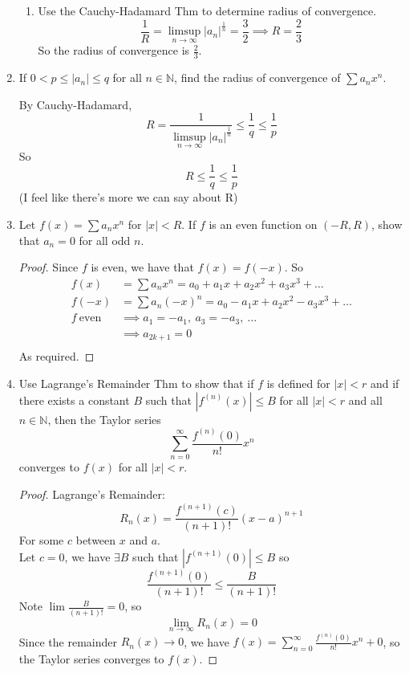 \documentclass[hidelinks,12pt]{article}
\renewcommand{\leq}{\leqslant}
\newcommand{\N}{\mathbb{N}}
\begin{document}
\begin{enumerate}
\begin{enumerate}
            \item Use the Cauchy-Hadamard Thm to determine radius of convergence.
                \[\frac{1}{R}=\limsup_{n\to\infty}|a_n|^{\frac{1}{n}}=\frac{3}{2}\implies R=\frac{2}{3}\] So the radius of convergence is $\frac{2}{3}$.
        \end{enumerate}
    \item If $0<p\leq|a_n|\leq q$ for all $n\in\N$, find the radius of convergence of $\sum a_nx^n$.
        \par\null\par By Cauchy-Hadamard, \[R=\frac{1}{\limsup_{n\to\infty}|a_n|^{\frac{1}{n}}}\leq\frac{1}{q}\leq\frac{1}{p}\] So \[R\leq\frac{1}{q}\leq\frac{1}{p}\] (I feel like there's more we can say about R)
    \item Let $f(x)=\sum a_nx^n$ for $|x|<R$. If $f$ is an even function on $(-R,R)$, show that $a_n=0$ for all odd $n$.
        \begin{proof}[Proof]
            Since $f$ is even, we have that $f(x)=f(-x)$. So 
            \begin{align*}
                f(x)&=\sum a_nx^n=a_0+a_1x+a_2x^2+a_3x^3+\dots\\
                f(-x)&=\sum a_n(-x)^n=a_0-a_1x+a_2x^2-a_3x^3+\dots\\
                f\ \mathrm{even}&\implies a_1=-a_1,\ a_3=-a_3,\ \dots\\
                                &\implies a_{2k+1}=0\\
            \end{align*} 
            As required.
        \end{proof}
    \item Use Lagrange's Remainder Thm to show that if $f$ is defined for $|x|<r$ and if there exists a constant $B$ such that $|f^{(n)}(x)|\leq B$ for all $|x|<r$ and all $n\in\N$, then the Taylor series \[\sum_{n=0}^{\infty}\frac{f^{(n)}(0)}{n!}x^n\] converges to $f(x)$ for all $|x|<r$.
        \begin{proof}[Proof]
           Lagrange's Remainder:
           \[R_n(x)=\frac{f^{(n+1)}(c)}{(n+1)!}(x-a)^{n+1}\]
           For some $c$ between $x$ and $a$.\\
       Let $c=0$, we have $\exists B$ such that $|f^{(n+1)}(0)|\leq B$ so 
           \[\frac{f^{(n+1)}(0)}{(n+1)!}\leq\frac{B}{(n+1)!}\]
           Note $\lim\frac{B}{(n+1)!}=0$, so
           \[\lim_{n\to\infty} R_n(x)=0\]
           Since the remainder $R_n(x)\to 0$, we have $f(x)=\sum_{n=0}^{\infty}\frac{f^{(n)}(0)}{n!}x^n+0$, so the Taylor series converges to $f(x)$.

\end{proof}
\end{enumerate}
\end{document}
